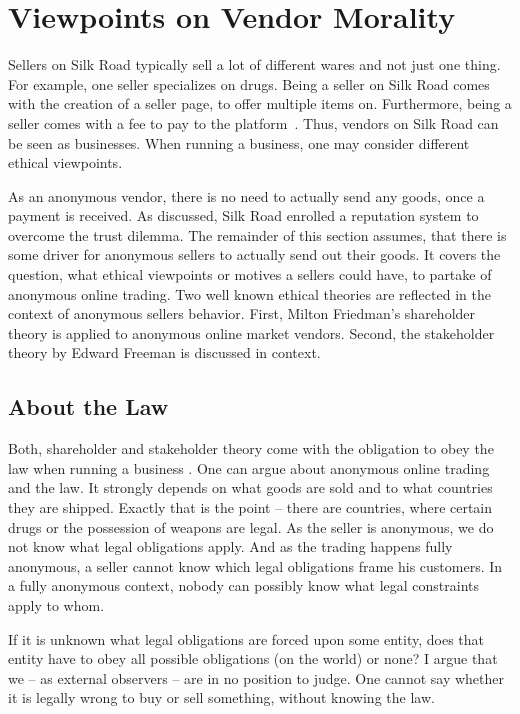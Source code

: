 \section{Viewpoints on Vendor Morality}
\label{vendors}

Sellers on Silk Road typically sell a lot of different wares and not just one thing. For example, one seller specializes on drugs. Being a seller on Silk Road comes with the creation of a seller page, to offer multiple items on. Furthermore, being a seller comes with a fee to pay to the platform~\cite{silkroad2013}. Thus, vendors on Silk Road can be seen as businesses. When running a business, one may consider different ethical viewpoints.

As an anonymous vendor, there is no need to actually send any goods, once a payment is received. As discussed, Silk Road enrolled a reputation system to overcome the trust dilemma. The remainder of this section assumes, that there is some driver for anonymous sellers to actually send out their goods. It covers the question, what ethical viewpoints or motives a sellers could have, to partake of anonymous online trading. Two well known ethical theories are reflected in the context of anonymous sellers behavior. First, Milton Friedman's shareholder theory \cite{shareholder} is applied to anonymous online market vendors. Second, the stakeholder theory by Edward Freeman \cite{stakeholder} is discussed in context.

\subsection{About the Law}

Both, shareholder and stakeholder theory come with the obligation to obey the law when running a business \cite{shareholder, stakeholder}. One can argue about anonymous online trading and the law. It strongly depends on what goods are sold and to what countries they are shipped. Exactly that is the point -- there are countries, where certain drugs or the possession of weapons are legal. As the seller is anonymous, we do not know what legal obligations apply. And as the trading happens fully anonymous, a seller cannot know which legal obligations frame his customers. In a fully anonymous context, nobody can possibly know what legal constraints apply to whom.

If it is unknown what legal obligations are forced upon some entity, does that entity have to obey all possible obligations (on the world) or none? I argue that we -- as external observers -- are in no position to judge. One cannot say whether it is legally wrong to buy or sell something, without knowing the law.

